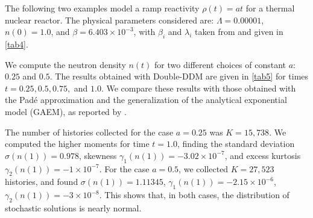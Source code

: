 \documentclass[preprint,12pt,authoryear]{elsarticle}
\begin{document}
The following two examples model a ramp reactivity $\rho(t)=at$ for a thermal nuclear reactor.
The physical parameters considered are: $\Lambda=0.00001$, $n(0)=1.0$, and $\beta=6.403\times 10^{-3}$, with $\beta_i$ and $\lambda_i$ taken from \citet{lewins_78} and given in \cref{tab4}.
\begin{table}[H]
\caption{Fraction of delayed neutrons and decay constants for the precursor groups.}\label{tab4}
\end{table}
We compute the neutron density $n(t)$ for two different choices of constant $a$: $0.25$ and $0.5$.
The results obtained with Double-DDM are given in \cref{tab5} for times $t=0.25, 0.5, 0.75,$ and $1.0$.
We compare these results with those obtained with the Pad\'e approximation \citep{aboanber_02} and the generalization of the analytical exponential model (GAEM), as reported by \citet{nahla_08}.
\begin{table}[H]
\caption{Neutron density $n(t)$ with ramp reactivity $\rho(t)=at$.}\label{tab5}
\end{table}
The number of histories collected for the case $a=0.25$ was $K=15,738$.
We computed the higher moments for time $t=1.0$, finding the standard deviation $\sigma(n(1))=0.978$, skewness $\gamma_1(n(1))=-3.02\times 10^{-7}$, and excess kurtosis $\gamma_2(n(1))=-1 \times 10^{-7}$.
For the case $a=0.5$, we collected $K=27,523$ histories, and found 
$\sigma(n(1))=1.11345$, $\gamma_1(n(1))=-2.15\times 10^{-6}$, $\gamma_2(n(1))=-3 \times 10^{-8}$.
This shows that, in both cases, the distribution of stochastic solutions is nearly normal.
\end{document}
